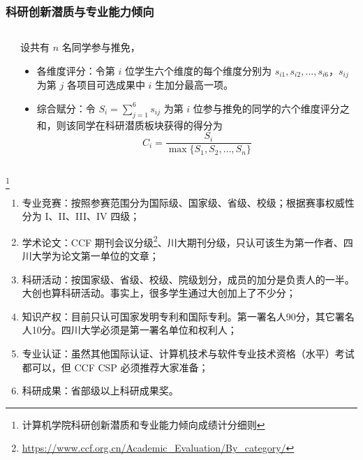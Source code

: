 \begin{frame}
	\frametitle{科研创新潜质与专业能力倾向}
	\begin{columns}
		\begin{column}{0.5\linewidth}
			\begin{center}
			\end{center}
		\end{column}
		\begin{column}{0.5\linewidth}
			设共有 $n$ 名同学参与推免，
			\begin{itemize}
				\item 各维度评分：令第 $i$ 位学生六个维度的每个维度分别为 $s_{i1}, s_{i2}, \ldots, s_{i6}$，$s_{ij}$ 为第 $j$ 各项目可选成果中 $i$ 生加分最高一项。
				\item 综合赋分：令 $S_i = \sum_{j=1}^6 s_{ij}$ 为第 $i$ 位参与推免的同学的六个维度评分之和，则该同学在科研潜质板块获得的得分为
				      \begin{equation}
					      C_i = \frac{S_i}{\max\{S_1, S_2, \ldots, S_n\}}
				      \end{equation}
			\end{itemize}
		\end{column}
	\end{columns}

	\footnote{计算机学院科研创新潜质和专业能力倾向成绩计分细则}
\end{frame}

\begin{frame}
	\begin{enumerate}
		\item 专业竞赛：按照参赛范围分为国际级、国家级、省级、校级；根据赛事权威性分为 I、II、III、IV 四级；
		\item 学术论文：{CCF 期刊会议分级}\footnote{\url{https://www.ccf.org.cn/Academic\_Evaluation/By\_category/}}、川大期刊分级，只认可该生为第一作者、四川大学为论文第一单位的文章；
		\item 科研活动：按国家级、省级、校级、院级划分，成员的加分是负责人的一半。大创也算科研活动。事实上，很多学生通过大创加上了不少分；
		\item 知识产权：目前只认可国家发明专利和国际专利。第一署名人90分，其它署名人10分。四川大学必须是第一署名单位和权利人；
		\item 专业认证：虽然其他国际认证、计算机技术与软件专业技术资格（水平）考试都可以，但 CCF CSP 必须推荐大家准备；
		\item 科研成果：省部级以上科研成果奖。%
	\end{enumerate}
\end{frame}


